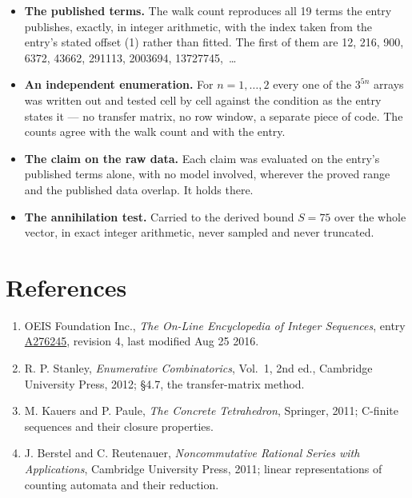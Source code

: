 \documentclass[11pt]{article}
\theoremstyle{definition}
\begin{document}
\begin{itemize}

\item {\bfseries The published terms.} The walk count reproduces all 19 terms the entry publishes, exactly, in integer arithmetic, with the index taken from the entry's stated offset (1) rather than fitted. The first of them are 12, 216, 900, 6372, 43662, 291113, 2003694, 13727745,~\dots

\item {\bfseries An independent enumeration.} For $n = 1,\dots,2$ every one of the $3^{5n}$ arrays was written out and tested cell by cell against the condition as the entry states it --- no transfer matrix, no row window, a separate piece of code. The counts agree with the walk count and with the entry.

\item {\bfseries The claim on the raw data.} Each claim was evaluated on the entry's published terms alone, with no model involved, wherever the proved range and the published data overlap. It holds there.

\item {\bfseries The annihilation test.} Carried to the derived bound $S = 75$ over the whole vector, in exact integer arithmetic, never sampled and never truncated.

\end{itemize}

\section{References}

\begin{enumerate}

\item OEIS Foundation Inc., \emph{The On-Line Encyclopedia of Integer Sequences}, entry \href{https://oeis.org/A276245}{A276245}, revision 4, last modified Aug 25 2016.

\item R. P. Stanley, \emph{Enumerative Combinatorics}, Vol.~1, 2nd ed., Cambridge University Press, 2012; \S4.7, the transfer-matrix method.

\item M. Kauers and P. Paule, \emph{The Concrete Tetrahedron}, Springer, 2011; C-finite sequences and their closure properties.

\item J. Berstel and C. Reutenauer, \emph{Noncommutative Rational Series with Applications}, Cambridge University Press, 2011; linear representations of counting automata and their reduction.

\end{enumerate}
\end{document}
